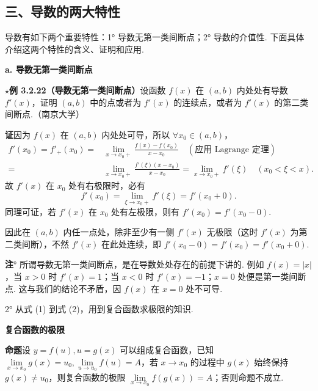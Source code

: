 \documentclass[UTF8, 12pt, fontset=fandol, oneside]{ctexart}
\begin{document}
\subsection*{三、导数的两大特性}

导数有如下两个重要特性：1° 导数无第一类间断点；2° 导数的介值性. 下面具体介绍这两个特性的含义、证明和应用.

\noindent\textbf{a. 导数无第一类间断点}

\noindent\textbf{$\star$例 3.2.22（导数无第一类间断点）}\quad 设函数 $f(x)$ 在 $(a,b)$ 内处处有导数 $f'(x)$，证明 $(a,b)$ 中的点或者为 $f'(x)$ 的连续点，或者为 $f'(x)$ 的第二类间断点.（南京大学）

\noindent\textbf{证}\quad 因为 $f(x)$ 在 $(a,b)$ 内处处可导，所以 $\forall x_0\in(a,b)$，
\begin{equation}
\begin{aligned}
f'(x_0)=f'_+(x_0)
={}&\lim_{x\to x_0+}\frac{f(x)-f(x_0)}{x-x_0}\quad(\text{应用 Lagrange 定理})\\
={}&\lim_{x\to x_0+}\frac{f'(\xi)(x-x_0)}{x-x_0}
=\lim_{x\to x_0+}f'(\xi)\quad(x_0<\xi<x).
\end{aligned}
\tag{1}
\end{equation}
故 $f'(x)$ 在 $x_0$ 处有右极限时，必有
\begin{equation}
  f'(x_0)=\lim_{\xi\to x_0+}f'(\xi)=f'(x_0+0).
\tag{2}
\end{equation}
同理可证，若 $f'(x)$ 在 $x_0$ 处有左极限，则有 $f'(x_0)=f'(x_0-0)$.

因此在 $(a,b)$ 内任一点处，除非至少有一侧 $f'(x)$ 无极限（这时 $f'(x)$ 为第二类间断），不然 $f'(x)$ 在此处连续，即 $f'(x_0-0)=f'(x_0)=f'(x_0+0)$.

\noindent\textbf{注}° 所谓导数无第一类间断点，是在导数处处存在的前提下讲的. 例如 $f(x)=|x|$，当 $x>0$ 时 $f'(x)=1$；当 $x<0$ 时 $f'(x)=-1$；$x=0$ 处便是第一类间断点. 这与我们的结论不矛盾，因 $f(x)$ 在 $x=0$ 处不可导.

2° 从式 (1) 到式 (2)，用到复合函数求极限的知识.

\noindent\textbf{复合函数的极限}

\noindent\textbf{命题}\quad 设 $y=f(u),u=g(x)$ 可以组成复合函数，已知 $\lim\limits_{x\to x_0}g(x)=u_0,\lim\limits_{u\to u_0}f(u)=A$，若 $x\to x_0$ 的过程中 $g(x)$ 始终保持 $g(x)\ne u_0$，则复合函数的极限 $\lim\limits_{x\to x_0}f(g(x))=A$；否则命题不成立.
\end{document}
